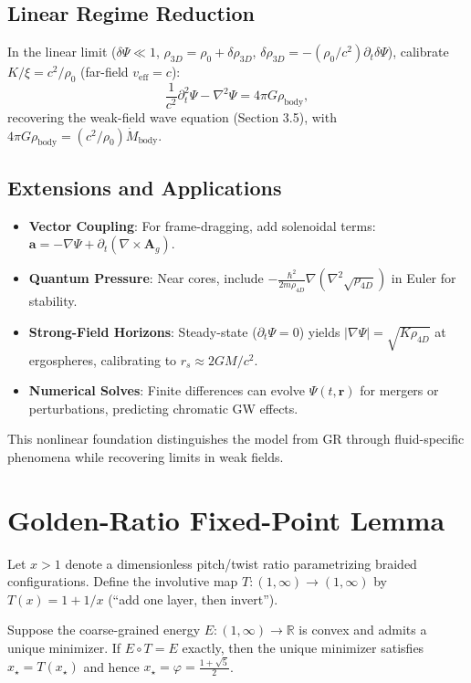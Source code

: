 \subsection{Linear Regime Reduction}

In the linear limit ($\delta \Psi \ll 1$, $\rho_{3D} = \rho_0 + \delta \rho_{3D}$, $\delta \rho_{3D} = -(\rho_0 / c^2) \partial_t \delta \Psi$), calibrate $K / \xi = c^2 / \rho_0$ (far-field $v_{\text{eff}} = c$):
\[
\frac{1}{c^2} \partial_t^2 \Psi - \nabla^2 \Psi = 4\pi G \rho_{\text{body}},
\]
recovering the weak-field wave equation (Section 3.5), with $4\pi G \rho_{\text{body}} = (c^2 / \rho_0) \dot{M}_{\text{body}}$.

\subsection{Extensions and Applications}

\begin{itemize}
\item \textbf{Vector Coupling}: For frame-dragging, add solenoidal terms:
$\mathbf{a} = -\nabla \Psi + \partial_t (\nabla \times \mathbf{A}_g)$.
\item \textbf{Quantum Pressure}: Near cores, include $-\frac{\hbar^2}{2m \rho_{4D}} \nabla (\nabla^2 \sqrt{\rho_{4D}})$ in Euler for stability.
\item \textbf{Strong-Field Horizons}: Steady-state ($\partial_t \Psi = 0$) yields $|\nabla \Psi| = \sqrt{K \rho_{4D}}$ at ergospheres, calibrating to $r_s \approx 2GM/c^2$.
\item \textbf{Numerical Solves}: Finite differences can evolve $\Psi(t,\mathbf{r})$ for mergers or perturbations, predicting chromatic GW effects.
\end{itemize}

This nonlinear foundation distinguishes the model from GR through fluid-specific phenomena while recovering limits in weak fields.


\section{Golden-Ratio Fixed-Point Lemma}\label{app:phi-fixed-point}

Let $x>1$ denote a dimensionless pitch/twist ratio parametrizing braided configurations.
Define the involutive map $T:(1,\infty)\to(1,\infty)$ by $T(x)=1+1/x$ (``add one layer, then invert'').

\begin{lemma}
Suppose the coarse-grained energy $E:(1,\infty)\to\mathbb{R}$ is convex and admits a unique minimizer.
If $E\circ T = E$ exactly, then the unique minimizer satisfies $x_\star = T(x_\star)$ and hence $x_\star=\varphi=\frac{1+\sqrt{5}}{2}$.
\end{lemma}

